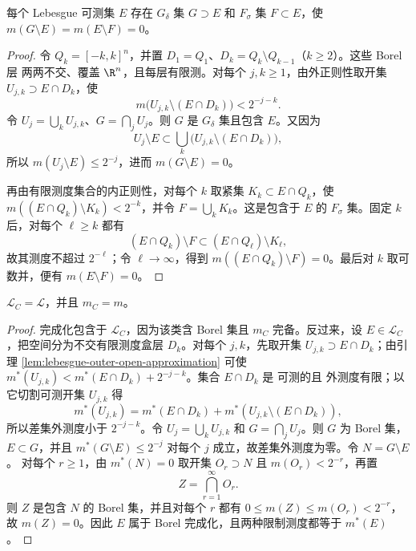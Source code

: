 \begin{proposition}[Borel 代表]\label{proposition:2-1-3-3}
每个 Lebesgue 可测集 $E$ 存在 $G_\delta$ 集 $G\supset E$ 和 $F_\sigma$ 集 $F\subset E$，使
$m(G\setminus E)=m(E\setminus F)=0$。
\end{proposition}

\begin{proof}
令 $Q_k=[-k,k]^n$，并置 $D_1=Q_1$、$D_k=Q_k\setminus Q_{k-1}$（$k\ge2$）。这些 Borel 层
两两不交、覆盖 $\R^n$，且每层有限测。对每个 $j,k\ge1$，由外正则性取开集
$U_{j,k}\supset E\cap D_k$，使
\[
 m\bigl(U_{j,k}\setminus(E\cap D_k)\bigr)<2^{-j-k}.
\]
令 $U_j=\bigcup_kU_{j,k}$、$G=\bigcap_jU_j$。则 $G$ 是 $G_\delta$ 集且包含 $E$。又因为
\[
 U_j\setminus E
 \subset\bigcup_k\bigl(U_{j,k}\setminus(E\cap D_k)\bigr),
\]
所以 $m(U_j\setminus E)\le2^{-j}$，进而 $m(G\setminus E)=0$。

再由有限测度集合的内正则性，对每个 $k$ 取紧集 $K_k\subset E\cap Q_k$，使
$m((E\cap Q_k)\setminus K_k)<2^{-k}$，并令 $F=\bigcup_kK_k$。这是包含于 $E$ 的
$F_\sigma$ 集。固定 $k$ 后，对每个 $\ell\ge k$ 都有
\[
 (E\cap Q_k)\setminus F
 \subset (E\cap Q_\ell)\setminus K_\ell,
\]
故其测度不超过 $2^{-\ell}$；令 $\ell\to\infty$，得到
$m((E\cap Q_k)\setminus F)=0$。最后对 $k$ 取可数并，便有 $m(E\setminus F)=0$。
\end{proof}

\begin{proposition}\label{lem:lebesgue-completion-characterization}
$\mathcal L_C=\mathcal L$，并且 $m_C=m$。
\end{proposition}

\begin{proof}
完成化包含于 $\mathcal L_C$，因为该类含 Borel 集且 $m_C$ 完备。反过来，设
$E\in\mathcal L_C$，把空间分为不交有限测度盒层 $D_k$。对每个 $j,k$，先取开集
$U_{j,k}\supset E\cap D_k$；由引理 \ref{lem:lebesgue-outer-open-approximation} 可使
$m^*(U_{j,k})<m^*(E\cap D_k)+2^{-j-k}$。集合 $E\cap D_k$ 是 \Caratheodory{} 可测的且
外测度有限；以它切割可测开集 $U_{j,k}$ 得
\[
 m^*(U_{j,k})=m^*(E\cap D_k)+m^*(U_{j,k}\setminus(E\cap D_k)),
\]
所以差集外测度小于 $2^{-j-k}$。令
$U_j=\bigcup_kU_{j,k}$ 和 $G=\bigcap_jU_j$。则 $G$ 为 Borel 集，$E\subset G$，并且
$m^*(G\setminus E)\le2^{-j}$ 对每个 $j$ 成立，故差集外测度为零。令 $N=G\setminus E$。
对每个 $r\ge1$，由 $m^*(N)=0$ 取开集 $O_r\supset N$ 且 $m(O_r)<2^{-r}$，再置
\[
 Z=\bigcap_{r=1}^{\infty}O_r.
\]
则 $Z$ 是包含 $N$ 的 Borel 集，并且对每个 $r$ 都有
$0\le m(Z)\le m(O_r)<2^{-r}$，故 $m(Z)=0$。因此 $E$ 属于
Borel 完成化，且两种限制测度都等于 $m^*(E)$。
\end{proof}

